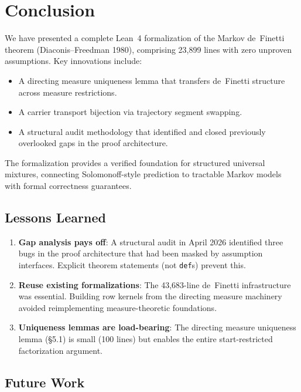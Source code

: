 \documentclass[11pt,a4paper]{article}
\theoremstyle{definition}
\begin{document}
\section{Conclusion}

We have presented a complete Lean~4 formalization of the Markov de~Finetti
theorem (Diaconis--Freedman 1980), comprising 23,899 lines with zero unproven
assumptions. Key innovations include:

\begin{itemize}
\item A directing measure uniqueness lemma that transfers de~Finetti structure
  across measure restrictions.
\item A carrier transport bijection via trajectory segment swapping.
\item A structural audit methodology that identified and closed previously
  overlooked gaps in the proof architecture.
\end{itemize}

The formalization provides a verified foundation for structured universal
mixtures, connecting Solomonoff-style prediction to tractable Markov models
with formal correctness guarantees.

\subsection{Lessons Learned}

\begin{enumerate}
\item \textbf{Gap analysis pays off}: A structural audit in April 2026
  identified three bugs in the proof architecture that had been masked by
  assumption interfaces. Explicit theorem statements (not \texttt{def}s)
  prevent this.
\item \textbf{Reuse existing formalizations}: The 43,683-line de~Finetti
  infrastructure was essential. Building row kernels from the directing
  measure machinery avoided reimplementing measure-theoretic foundations.
\item \textbf{Uniqueness lemmas are load-bearing}: The directing measure
  uniqueness lemma (\S5.1) is small (100 lines) but enables the entire
  start-restricted factorization argument.
\end{enumerate}

\subsection{Future Work}
\end{document}
